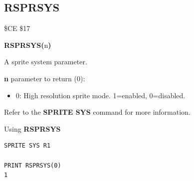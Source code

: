 
\newpage
\subsection{RSPRSYS}
\begin{description}[leftmargin=2cm,style=nextline]
\item [Token:]    \$CE \$17

\item [Format:]   {\bf RSPRSYS(}n{\bf)}

\item [Returns:]  A sprite system parameter.

                  {\bf n} parameter to return (0):

                  \begin{itemize}
                     \item 0: High resolution sprite mode. 1=enabled, 0=disabled.
                  \end{itemize}

\item [Remarks:]  Refer to the {\bf SPRITE SYS} command for more information.

\item [Example:]  Using {\bf RSPRSYS}

\begin{tcolorbox}[colback=black,coltext=white]
\verbatimfont{\codefont}
\begin{verbatim}
SPRITE SYS R1

PRINT RSPRSYS(0)
1
\end{verbatim}
\end{tcolorbox}
\end{description}



\newpage
